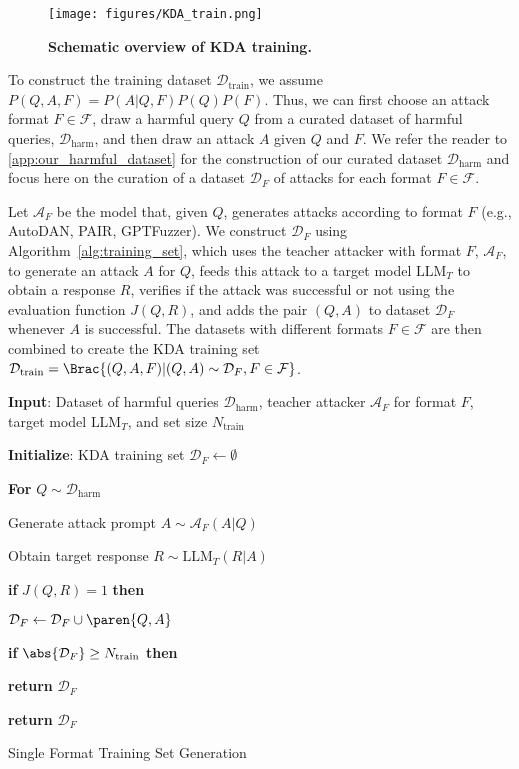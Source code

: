 \begin{figure}[!tbp]
\centering
    \texttt{[image: figures/KDA\_train.png]}
    \caption{\textbf{Schematic overview of KDA training.}}
    \label{fig:kda_training} 
\end{figure}

To construct the training dataset $\mathcal{D}_{\text{train}}$,
we assume $P(Q,A,F) = P(A|Q,F)P(Q)P(F)$. Thus, we can first choose an attack format $F\in \mathcal{F}$, draw a harmful query $Q$ from a curated dataset of harmful queries, $\mathcal{D}_{\text{harm}}$, and then draw an attack $A$ given $Q$ and $F$. We refer the reader to \autoref{app:our_harmful_dataset} for the construction of our curated  dataset $\mathcal{D}_{\text{harm}}$ and focus here on the curation of a dataset $\mathcal{D}_F$ of attacks for each format $F\in\mathcal{F}$. 

Let $\mathcal{A}_F$ be the model that, given $Q$, generates attacks according to format $F$ (e.g., AutoDAN, PAIR, GPTFuzzer). We construct $\mathcal{D}_F$ using  Algorithm~\ref{alg:training_set}, which uses the teacher attacker with format $F$, $\mathcal{A}_F$, to generate an attack $A$ for $Q$, feeds this attack to a target model $\text{LLM}_{T}$ to obtain a response $R$, verifies if the attack was successful or not using the evaluation function $J(Q,R)$, and adds the pair $(Q,A)$ to dataset $\mathcal{D}_F$ whenever $A$ is successful. The datasets with different formats $F\in \mathcal{F}$ are then combined to create the KDA training set $\mathcal{D}_{\text{train}}=\Brac{(Q, A, F) | (Q,A)\sim \mathcal{D}_F, F\in\mathcal{F}}$.

\vspace{-1mm}
\begin{algorithm}[h]
\textbf{Input}: Dataset of harmful queries $\mathcal{D}_{\text{harm}}$, teacher attacker $\mathcal{A}_F$ for format $F$, target model $\text{LLM}_{T}$, and set size $N_{\text{train}}$

\textbf{Initialize}: KDA training set $\mathcal{D}_F \leftarrow \emptyset$

\textbf{For} {$Q\sim \mathcal{D}_{\text{harm}}$}  

\quad Generate attack prompt $A \sim \mathcal{A}_F(A|Q)$  

\quad Obtain target response $R \sim \text{LLM}_{T}(R|A)$ 

\quad \textbf{if} $J(Q,R) = 1$  \textbf{then} 

\quad \quad $\mathcal{D}_F \gets\mathcal{D}_F \cup \paren{Q, A}$

\quad \quad \textbf{if} $\abs{\mathcal{D}_F}\geq N_{\text{train}}$  \textbf{then}

\quad \quad \quad \textbf{return} $\mathcal{D}_F$ 

\textbf{return} $\mathcal{D}_F$ 

\caption{Single Format Training Set Generation}\label{alg:training_set}
\end{algorithm}
\vspace{-2mm}

